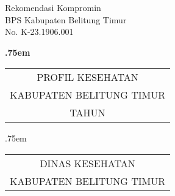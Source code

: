 \begin{titlepage}
    \begin{center}
        {\raggedleft Rekomendasi Kompromin\\BPS Kabupaten Belitung Timur\\No. K-23.1906.001
        
        }
        \vspace*{48ex}
            
        {\LARGE \bfseries
        	\lineskip .75em%
        	\begin{tabular}[t]{c}%
        		PROFIL KESEHATAN\\KABUPATEN BELITUNG TIMUR\\TAHUN \tPnos{}
        	\end{tabular}\par}%
            
            
        \vspace{3ex}
        {\large
        	\lineskip .75em%
        	\begin{tabular}[t]{c}%
        		DINAS KESEHATAN\\KABUPATEN BELITUNG TIMUR
        	\end{tabular}\par}%
            
            
        \vspace{1.5ex}
    \end{center}
\end{titlepage}